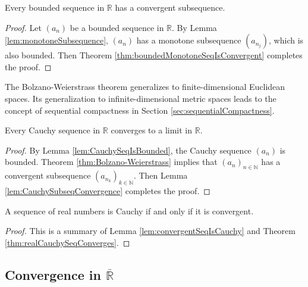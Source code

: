 \begin{thm}
  \label{thm:Bolzano-Weierstrass}
  Every bounded sequence in $\mathbb{R}$
  has a convergent subsequence.
\end{thm}
\begin{proof}
  Let $(a_{n})$ be a bounded sequence in $\mathbb{R}$.
  By Lemma \ref{lem:monotoneSubsequence},
  $(a_{n})$ has a monotone subsequence $(a_{n_{j}})$,
  which is also bounded.
  Then Theorem \ref{thm:boundedMonotoneSeqIsConvergent}
  completes the proof.
\end{proof}

\begin{rem}
  The Bolzano-Weierstrass theorem generalizes
  to finite-dimensional Euclidean spaces.
  Its generalization to infinite-dimensional metric spaces
  leads to the concept of sequential compactness
  in Section \ref{sec:sequentialCompactness}. 
\end{rem}

\begin{thm}%
  \label{thm:realCauchySeqConverges}
  Every Cauchy sequence in $\mathbb{R}$
  converges to a limit in $\mathbb{R}$.
\end{thm}
\begin{proof}
  By Lemma \ref{lem:CauchySeqIsBounded},
  the Cauchy sequence $(a_n)$ is bounded.
  Theorem \ref{thm:Bolzano-Weierstrass}
  implies that $(a_n)_{n\in \mathbb{N}}$ has a convergent
  subsequence $(a_{n_k})_{k\in \mathbb{N}}$.
  Then Lemma \ref{lem:CauchySubseqConvergence}
  completes the proof.
\end{proof}

\begin{thm}
  \label{thm:completenessOfRealNumbers}
  A sequence of real numbers is Cauchy
  if and only if it is convergent.
\end{thm}
\begin{proof}
  This is a summary of
  Lemma \ref{lem:convergentSeqIsCauchy}
  and Theorem \ref{thm:realCauchySeqConverges}.
\end{proof}


\subsection{Convergence in $\overline{\mathbb{R}}$}
\label{sec:convergenceOfSequenceInRStar}

